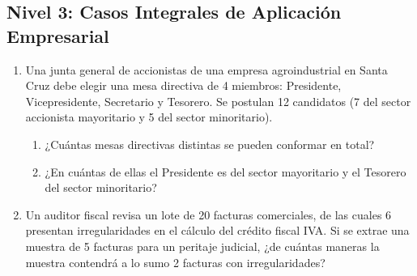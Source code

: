 \subsection*{Nivel 3: Casos Integrales de Aplicación Empresarial}
\begin{enumerate}[resume]
    \item Una junta general de accionistas de una empresa agroindustrial en Santa Cruz debe elegir una mesa directiva de 4 miembros: Presidente, Vicepresidente, Secretario y Tesorero. Se postulan 12 candidatos (7 del sector accionista mayoritario y 5 del sector minoritario).
    \begin{enumerate}[label=\alph*)]
        \item ¿Cuántas mesas directivas distintas se pueden conformar en total?
        \item ¿En cuántas de ellas el Presidente es del sector mayoritario y el Tesorero del sector minoritario?
    \end{enumerate}
    \item Un auditor fiscal revisa un lote de 20 facturas comerciales, de las cuales 6 presentan irregularidades en el cálculo del crédito fiscal IVA. Si se extrae una muestra de 5 facturas para un peritaje judicial, ¿de cuántas maneras la muestra contendrá a lo sumo 2 facturas con irregularidades?
\end{enumerate}
